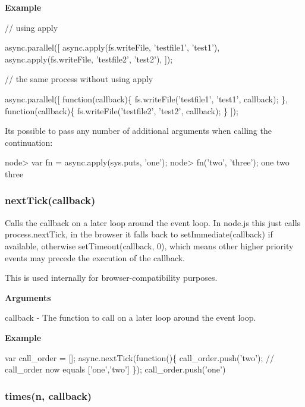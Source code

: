 {\bfseries Example}


\begin{DoxyCode}
// using apply

async.parallel([
    async.apply(fs.writeFile, 'testfile1', 'test1'),
    async.apply(fs.writeFile, 'testfile2', 'test2'),
]);


// the same process without using apply

async.parallel([
    function(callback)\{
        fs.writeFile('testfile1', 'test1', callback);
    \},
    function(callback)\{
        fs.writeFile('testfile2', 'test2', callback);
    \}
]);
\end{DoxyCode}


It\textquotesingle{}s possible to pass any number of additional arguments when calling the continuation\+:


\begin{DoxyCode}
node> var fn = async.apply(sys.puts, 'one');
node> fn('two', 'three');
one
two
three
\end{DoxyCode}
 



\label{_nextTick}%
 \subsubsection*{next\+Tick(callback)}

Calls the callback on a later loop around the event loop. In node.\+js this just calls process.\+next\+Tick, in the browser it falls back to set\+Immediate(callback) if available, otherwise set\+Timeout(callback, 0), which means other higher priority events may precede the execution of the callback.

This is used internally for browser-\/compatibility purposes.

{\bfseries Arguments}


\begin{DoxyItemize}
\item callback -\/ The function to call on a later loop around the event loop.
\end{DoxyItemize}

{\bfseries Example}


\begin{DoxyCode}
var call\_order = [];
async.nextTick(function()\{
    call\_order.push('two');
    // call\_order now equals ['one','two']
\});
call\_order.push('one')
\end{DoxyCode}


\label{_times}%
 \subsubsection*{times(n, callback)}

